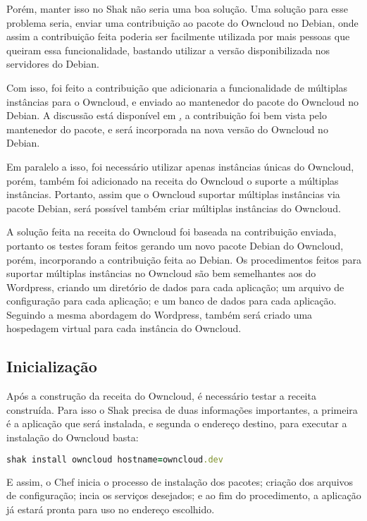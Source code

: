 Porém, manter isso no Shak não seria uma boa solução. Uma solução para esse problema seria, 
enviar uma contribuição ao pacote do Owncloud no Debian, onde assim a contribuição feita
poderia ser facilmente utilizada por mais pessoas que queiram essa funcionalidade,
bastando utilizar a versão disponibilizada nos servidores do Debian. 

Com isso, foi feito a contribuição que adicionaria a funcionalidade de múltiplas 
instâncias para o Owncloud, e enviado ao mantenedor do pacote do Owncloud no Debian. 
A discussão está disponível em \href{https://bugs.debian.org/cgi-bin/bugreport.cgi?bug=789726},
a contribuição foi bem vista pelo mantenedor do pacote, e será incorporada na nova
versão do Owncloud no Debian.

Em paralelo a isso,
foi necessário utilizar apenas instâncias únicas do Owncloud, porém, também foi
adicionado na receita do Owncloud o suporte a múltiplas instâncias. Portanto, 
assim que o Owncloud suportar múltiplas instâncias via pacote Debian, será possível
também criar múltiplas instâncias do Owncloud.

A solução feita na receita do Owncloud foi baseada na contribuição enviada, portanto
os testes foram feitos gerando um novo pacote Debian do Owncloud, porém, incorporando
a contribuição feita ao Debian. Os procedimentos feitos para suportar múltiplas instâncias
no Owncloud são bem semelhantes aos do Wordpress, criando um diretório de dados
para cada aplicação; um arquivo de configuração para cada aplicação; e um banco de
dados para cada aplicação. Seguindo a mesma abordagem do Wordpress, também
será criado uma hospedagem virtual para cada instância do Owncloud.

\subsection{Inicialização}

Após a construção da receita do Owncloud, é necessário testar a receita construída. 
Para isso o Shak precisa de duas informações importantes, a primeira é a aplicação
que será instalada, e segunda o endereço destino, para executar a instalação
do Owncloud basta:

\begin{lstlisting}[language=Ruby,label=dice_index,caption={Exemplo de execução de instalação do Owncloud com shak}]
shak install owncloud hostname=owncloud.dev
\end{lstlisting}

E assim, o Chef inicia o processo de instalação dos pacotes; criação dos arquivos
de configuração; incia os serviços desejados; e ao fim do procedimento, a aplicação
já estará pronta para uso no endereço escolhido.

